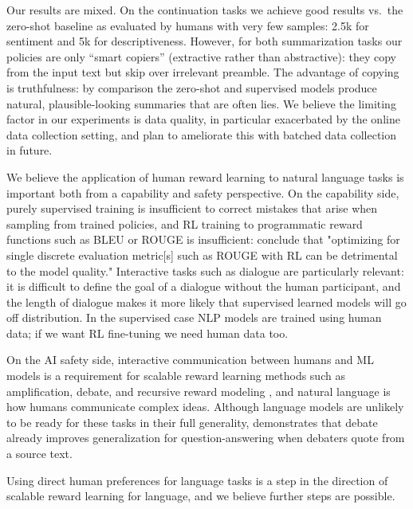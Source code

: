 Our results are mixed.  On the continuation tasks we achieve good results vs.\ the zero-shot baseline as evaluated by humans with very few samples: 2.5k for sentiment and 5k for descriptiveness.  However, for both summarization tasks our policies are only ``smart copiers'' (extractive rather than abstractive): they copy from the input text but skip over irrelevant preamble.  The advantage of copying is truthfulness: by comparison the zero-shot and supervised models produce natural, plausible-looking summaries that are often lies.  We believe the limiting factor in our experiments is data quality, in particular exacerbated by the online data collection setting, and plan to ameliorate this with batched data collection in future.

We believe the application of human reward learning to natural language tasks is important both from a capability and safety perspective.  On the capability side, purely supervised training is insufficient to correct mistakes that arise when sampling from trained policies, and RL training to programmatic reward functions such as BLEU or ROUGE is insufficient: \citet{paulus2017deep} conclude that "optimizing for single discrete evaluation metric[s] such as ROUGE with RL can be detrimental to the model quality."  Interactive tasks such as dialogue are particularly relevant: it is difficult to define the goal of a dialogue without the human participant, and the length of dialogue makes it more likely that supervised learned models will go off distribution.  In the supervised case NLP models are trained using human data; if we want RL fine-tuning we need human data too.

On the AI safety side, interactive communication between humans and ML models is a requirement for scalable reward learning methods such as amplification, debate, and recursive reward modeling \citep{christiano2018amplification,irving2018debate,leike2018scalable}, and natural language is how humans communicate complex ideas.  Although language models are unlikely to be ready for these tasks in their full generality, \citet{perez2019convince} demonstrates that debate already improves generalization for question-answering when debaters quote from a source text.

Using direct human preferences for language tasks is a step in the direction of scalable reward learning for language, and we believe further steps are possible.



